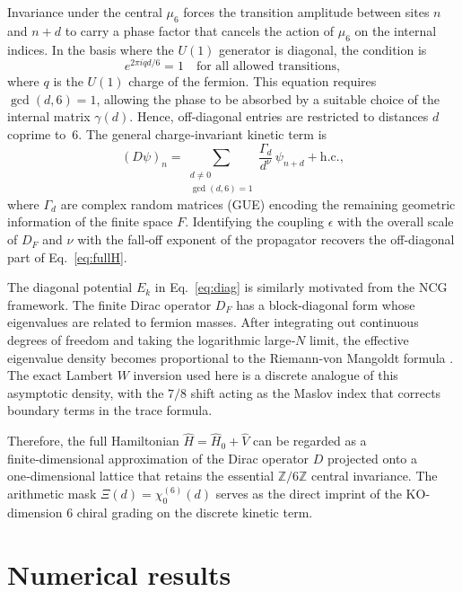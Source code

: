 \documentclass[11pt,a4paper]{article}
\begin{document}
Invariance under the central $\mu_6$ forces the transition amplitude between sites $n$ and $n+d$ to carry a phase factor that cancels the action of $\mu_6$ on the internal indices. In the basis where the $U(1)$ generator is diagonal, the condition is
\begin{equation}
e^{2\pi i q d /6} = 1 \quad \text{for all allowed transitions},
\end{equation}
where $q$ is the $U(1)$ charge of the fermion. This equation requires $\gcd(d,6)=1$, allowing the phase to be absorbed by a suitable choice of the internal matrix $\gamma(d)$. Hence, off‑diagonal entries are restricted to distances $d$ coprime to~6. The general charge‑invariant kinetic term is
\begin{equation}
(D\psi)_n = \sum_{\substack{d\neq 0 \\ \gcd(d,6)=1}} \frac{\Gamma_d}{d^{\nu}} \, \psi_{n+d} + \text{h.c.},
\end{equation}
where $\Gamma_d$ are complex random matrices (GUE) encoding the remaining geometric information of the finite space $F$. Identifying the coupling $\epsilon$ with the overall scale of $D_F$ and $\nu$ with the fall‑off exponent of the propagator recovers the off‑diagonal part of Eq.~\eqref{eq:fullH}.

The diagonal potential $E_k$ in Eq.~\eqref{eq:diag} is similarly motivated from the NCG framework. The finite Dirac operator $D_F$ has a block‑diagonal form whose eigenvalues are related to fermion masses. After integrating out continuous degrees of freedom and taking the logarithmic large‑$N$ limit, the effective eigenvalue density becomes proportional to the Riemann‑von Mangoldt formula \cite{Connes1999}. The exact Lambert $W$ inversion used here is a discrete analogue of this asymptotic density, with the $7/8$ shift acting as the Maslov index that corrects boundary terms in the trace formula.

Therefore, the full Hamiltonian $\hat H = \hat H_0 + \hat V$ can be regarded as a finite‑dimensional approximation of the Dirac operator $D$ projected onto a one‑dimensional lattice that retains the essential $\mathbb{Z}/6\mathbb{Z}$ central invariance. The arithmetic mask $\Xi(d)=\chi_0^{(6)}(d)$ serves as the direct imprint of the KO-dimension 6 chiral grading on the discrete kinetic term. 

\section{Numerical results}
\label{sec:results}
\end{document}

